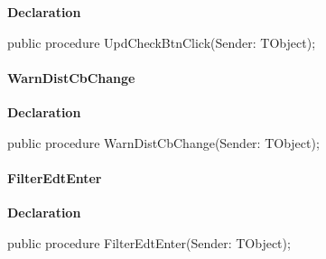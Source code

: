 \documentclass{report}
\newif\ifpdf
\begin{document}
\label{manager.TMnFrm-UpdCheckBtnClick}
\begin{list}{}{
\setlength{\itemindent}{0cm}
\setlength{\listparindent}{0cm}
\setlength{\leftmargin}{\evensidemargin}
\addtolength{\leftmargin}{\tmplength}
\settowidth{\labelsep}{X}
\addtolength{\leftmargin}{\labelsep}
\setlength{\labelwidth}{\tmplength}
}
\item[\textbf{Declaration}\hfill]
\ifpdf
\begin{flushleft}
\fi
\begin{ttfamily}
public procedure UpdCheckBtnClick(Sender: TObject);\end{ttfamily}

\ifpdf
\end{flushleft}
\fi

\end{list}
\paragraph*{WarnDistCbChange}\hspace*{\fill}

\label{manager.TMnFrm-WarnDistCbChange}
\begin{list}{}{
\setlength{\itemindent}{0cm}
\setlength{\listparindent}{0cm}
\setlength{\leftmargin}{\evensidemargin}
\addtolength{\leftmargin}{\tmplength}
\settowidth{\labelsep}{X}
\addtolength{\leftmargin}{\labelsep}
\setlength{\labelwidth}{\tmplength}
}
\item[\textbf{Declaration}\hfill]
\ifpdf
\begin{flushleft}
\fi
\begin{ttfamily}
public procedure WarnDistCbChange(Sender: TObject);\end{ttfamily}

\ifpdf
\end{flushleft}
\fi

\end{list}
\paragraph*{FilterEdtEnter}\hspace*{\fill}

\label{manager.TMnFrm-FilterEdtEnter}
\begin{list}{}{
\setlength{\itemindent}{0cm}
\setlength{\listparindent}{0cm}
\setlength{\leftmargin}{\evensidemargin}
\addtolength{\leftmargin}{\tmplength}
\settowidth{\labelsep}{X}
\addtolength{\leftmargin}{\labelsep}
\setlength{\labelwidth}{\tmplength}
}
\item[\textbf{Declaration}\hfill]
\ifpdf
\begin{flushleft}
\fi
\begin{ttfamily}
public procedure FilterEdtEnter(Sender: TObject);\end{ttfamily}

\ifpdf
\end{flushleft}
\fi

\end{list}
\end{document}
